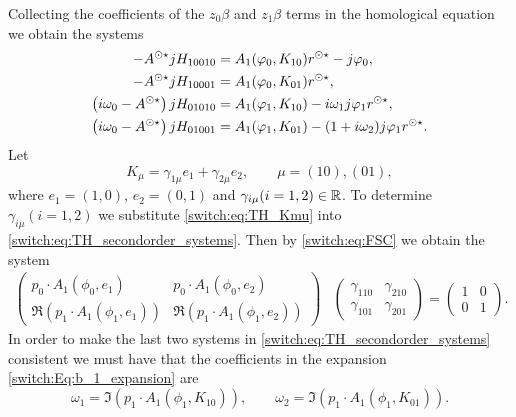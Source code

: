\begin{subappendices}
Collecting the coefficients of the $z_{0}\beta$ and $z_{1}\beta$ terms in the homological equation we obtain the systems
\begin{align} \label{switch:eq:TH_secondorder_systems}
\begin{split}
-A^{\odot\star} jH_{10010} & = A_{1}(\varphi_{0},K_{10})r^{\odot\star} - j\varphi_{0},\\
-A^{\odot\star} jH_{10001} & = A_{1}(\varphi_{0},K_{01}) r^{\odot\star}, \\
\left(i\omega_{0}-A^{\odot\star}\right) jH_{01010} & = A_{1}(\varphi_{1},K_{10})-i\omega_{1}j\varphi_{1} r^{\odot\star}, \\
\left(i\omega_{0}-A^{\odot\star}\right) jH_{01001} & = A_{1}(\varphi_{1},K_{01})-(1+i\omega_{2})j\varphi_{1} r^{\odot\star}.
\end{split}
\end{align}
Let
\begin{equation} \label{switch:eq:TH_Kmu}
K_{\mu}=\gamma_{1\mu}e_{1}+\gamma_{2\mu}e_{2}, \qquad \mu=(10),(01),
\end{equation}
where $e_{1}=(1,0)$, $e_{2}=(0,1)$ and $\gamma_{i\mu}(i=1,2)\in \mathbb{R}$. To determine $\gamma_{i\mu}(i=1,2)$ we substitute \cref{switch:eq:TH_Kmu} into \cref{switch:eq:TH_secondorder_systems}. Then by \cref{switch:eq:FSC} we obtain the system
\begin{align*}
\begin{pmatrix}
p_{0}\cdot A_{1}(\phi_{0},e_{1}) & p_{0}\cdot A_{1}(\phi_{0},e_{2})\\
\Re \left(p_{1}\cdot A_{1}(\phi_{1},e_{1}) \right) & \Re\left(p_{1}\cdot A_{1}(\phi_{1},e_{2})\right)
\end{pmatrix} & \begin{pmatrix}
\gamma_{110} & \gamma_{210}\\
\gamma_{101} & \gamma_{201}
\end{pmatrix}=\begin{pmatrix}
1 & 0\\
0 & 1
\end{pmatrix}.
\end{align*}
In order to make the last two systems in \cref{switch:eq:TH_secondorder_systems} consistent we must have that the coefficients in the expansion \cref{switch:Eq:b_1_expansion} are 
\begin{equation}
\label{switch:eq:HT_omega_1_omega_2}
\omega_{1} = \Im\left(p_{1}\cdot A_{1}(\phi_{1},K_{10})\right),
            \qquad \omega_{2} = \Im\left(p_{1}\cdot A_{1}(\phi_{1},K_{01})\right).
\end{equation}

\end{subappendices}
